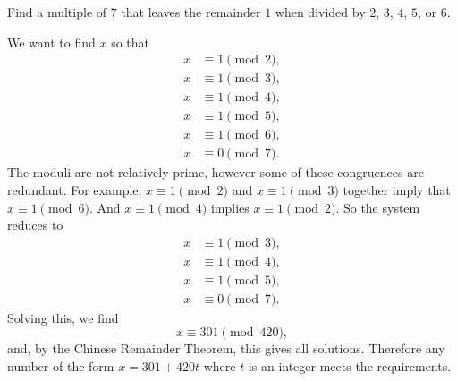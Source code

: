  Find a multiple of $7$ that leaves the remainder $1$ when
divided by $2$, $3$, $4$, $5$, or $6$.
\begin{solution}
  We want to find $x$ so that
  \begin{align*}
    x&\equiv1\pmod2, \\
    x&\equiv1\pmod3, \\
    x&\equiv1\pmod4, \\
    x&\equiv1\pmod5, \\
    x&\equiv1\pmod6, \\
    x&\equiv0\pmod7.
  \end{align*}
  The moduli are not relatively prime, however some of these
  congruences are redundant. For example, $x\equiv1\pmod2$ and
  $x\equiv1\pmod3$ together imply that $x\equiv1\pmod6$. And
  $x\equiv1\pmod4$ implies $x\equiv1\pmod2$. So the system reduces to
  \begin{align*}
    x&\equiv1\pmod3, \\
    x&\equiv1\pmod4, \\
    x&\equiv1\pmod5, \\
    x&\equiv0\pmod7.
  \end{align*}
  Solving this, we find
  \begin{equation*}
    x\equiv301 \pmod{420},
  \end{equation*}
  and, by the Chinese Remainder Theorem, this gives all
  solutions. Therefore any number of the form $x = 301 + 420t$ where
  $t$ is an integer meets the requirements.
\end{solution}
